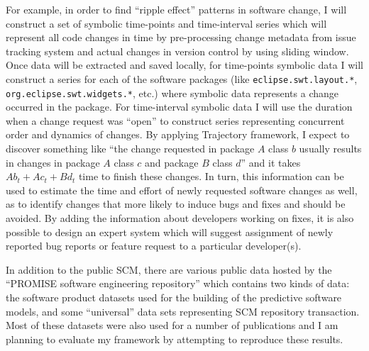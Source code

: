 For example, in order to find ``ripple effect'' patterns in software change, I will construct a set of symbolic time-points and time-interval series which will represent all code changes in time by pre-processing change metadata from issue tracking system and actual changes in version control by using sliding window. Once data will be extracted and saved locally, for time-points symbolic data I will construct a series for each of the software packages (like \texttt{eclipse.swt.layout.*}, \texttt{org.eclipse.swt.widgets.*}, etc.) where symbolic data represents a change occurred in the package. For time-interval symbolic data I will use the duration when a change request was ``open'' to construct series representing concurrent order and dynamics of changes. By applying Trajectory framework, I expect to discover something like ``the change requested in package $A$ class $b$ usually results in changes in package $A$ class $c$ and package $B$ class $d$'' and it takes $Ab_{t} + Ac_{t} + Bd_{t}$ time to finish these changes. In turn, this information can be used to estimate the time and effort of newly requested software changes as well, as to identify changes that more likely to induce bugs and fixes and should be avoided. By adding the information about developers working on fixes, it is also possible to design an expert system which will suggest assignment of newly reported bug reports or feature request to a particular developer(s).

In addition to the public SCM, there are various public data hosted by the ``PROMISE software engineering repository'' \cite{Sayyad:2005} which contains two kinds of data: the software product datasets used for the building of the predictive software models, and some ``universal'' data sets representing SCM repository transaction. Most of these datasets were also used for a number of publications and I am planning to evaluate my framework by attempting to reproduce these results. 
